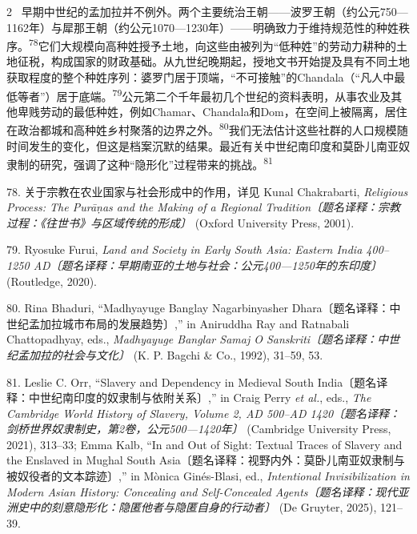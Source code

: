 \documentclass[10pt,a4paper]{article}
\begin{document}
\begin{paracol}{2}
\switchcolumn*
{\scriptsize\color{gray} [p. 17]}\ 早期中世纪的孟加拉并不例外。两个主要统治王朝——波罗王朝（约公元750—1162年）与犀那王朝（约公元1070—1230年）——明确致力于维持规范性的种姓秩\mbox{序。\textsuperscript{78}}它们大规模向高种姓授予土地，向这些由被列为“低种姓”的劳动力耕种的土地征税，构成国家的财政基础。从九世纪晚期起，授地文书开始提及具有不同土地获取程度的整个种姓序列：婆罗门居于顶端，“不可接触”的Chandala（“凡人中最低等者”）居于底\mbox{端。\textsuperscript{79}}公元第二个千年最初几个世纪的资料表明，从事农业及其他卑贱劳动的最低种姓，例如Chamar、Chandala和Dom，在空间上被隔离，居住在政治都城和高种姓乡村聚落的边界之\mbox{外。\textsuperscript{80}}我们无法估计这些社群的人口规模随时间发生的变化，但这是档案沉默的结果。最近有关中世纪南印度和莫卧儿南亚奴隶制的研究，强调了这种“隐形化”过程带来的挑\mbox{战。\textsuperscript{81}}\par{\small 78. 关于宗教在农业国家与社会形成中的作用，详见 Kunal Chakrabarti, \textit{Religious Process: The Purāṇas and the Making of a Regional Tradition〔题名译释：宗教过程：《往世书》与区域传统的形成〕} (Oxford University Press, 2001).\par}{\small 79. Ryosuke Furui, \textit{Land and Society in Early South Asia: Eastern India 400–1250 AD〔题名译释：早期南亚的土地与社会：公元400—1250年的东印度〕} (Routledge, 2020).\par}{\small 80. Rina Bhaduri, “Madhyayuge Banglay Nagarbinyasher Dhara〔题名译释：中世纪孟加拉城市布局的发展趋势〕,” in Aniruddha Ray and Ratnabali Chattopadhyay, eds., \textit{Madhyayuge Banglar Samaj O Sanskriti〔题名译释：中世纪孟加拉的社会与文化〕} (K. P. Bagchi \& Co., 1992), 31–59, 53.\par}{\small 81. Leslie C. Orr, “Slavery and Dependency in Medieval South India〔题名译释：中世纪南印度的奴隶制与依附关系〕,” in Craig Perry \textit{et al.}, eds., \textit{The Cambridge World History of Slavery, Volume 2, AD 500–AD 1420〔题名译释：剑桥世界奴隶制史，第2卷，公元500—1420年〕} (Cambridge University Press, 2021), 313–33; Emma Kalb, “In and Out of Sight: Textual Traces of Slavery and the Enslaved in Mughal South Asia〔题名译释：视野内外：莫卧儿南亚奴隶制与被奴役者的文本踪迹〕,” in Mònica Ginés-Blasi, ed., \textit{Intentional Invisibilization in Modern Asian History: Concealing and Self-Concealed Agents〔题名译释：现代亚洲史中的刻意隐形化：隐匿他者与隐匿自身的行动者〕} (De Gruyter, 2025), 121–39.\par}
\switchcolumn

\end{paracol}
\end{document}

